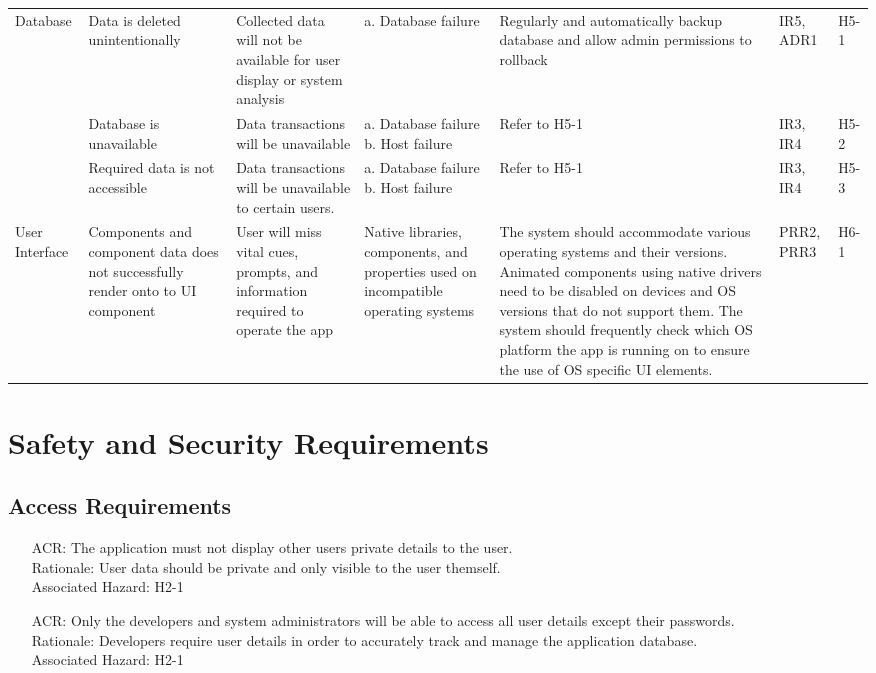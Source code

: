 \documentclass{article}
\newcounter{ACRnum}
\begin{document}
\begin{adjustwidth}{-3cm}{-1cm}
	 \noindent\begin{tabular}{ |p{3.3cm}|p{2.5cm}|p{3.2cm}|p{2cm}|p{2.5cm}|p{1cm}|p{1cm}| @{} }
	\hline
	Database& Data is deleted unintentionally& Collected data will not be available for user display or system analysis& a. Database failure & Regularly and automatically backup database and allow admin permissions to rollback & IR5, ADR1& H5-1\\
	\cline{2-7}
	& Database is unavailable & Data transactions will be unavailable & a. Database failure \newline b. Host failure& Refer to H5-1 & IR3, IR4 & H5-2\\
	\cline{2-7}
	& Required data is not accessible &  Data transactions will be unavailable to certain users. & a. Database failure \newline b. Host failure & Refer to H5-1 & IR3, IR4 &H5-3\\
	\hline
	User Interface & Components and component data does not successfully render onto to UI component & User will miss vital cues, prompts, and information required to operate
	the app & Native libraries, components, and properties used on incompatible operating systems & The system should accommodate various operating systems and
	their versions. Animated components using native drivers need to be disabled on devices and OS versions that do not support them. 
	The system should frequently check which OS platform the app is running on to ensure the use of OS specific UI elements. & PRR2, PRR3 & H6-1\\
	\hline
	\end{tabular}
	\end{adjustwidth}
	\section{Safety and Security Requirements}
	
	\subsection{Access Requirements}
	\noindent 
	\begin{itemize}
		\item[ACR\refstepcounter{ACRnum}\theACRnum:]
		The application must not display other users private details to the user.
		\\Rationale: User data should be private and only visible to the user themself.
		\\Associated Hazard: H2-1
		\item[ACR\refstepcounter{ACRnum}\theACRnum:]
		Only the developers and system administrators will be able to access all user details except their passwords.
		\\Rationale: Developers require user details in order to accurately track and manage the application database.
		\\Associated Hazard: H2-1
	\end{itemize}
\end{document}
